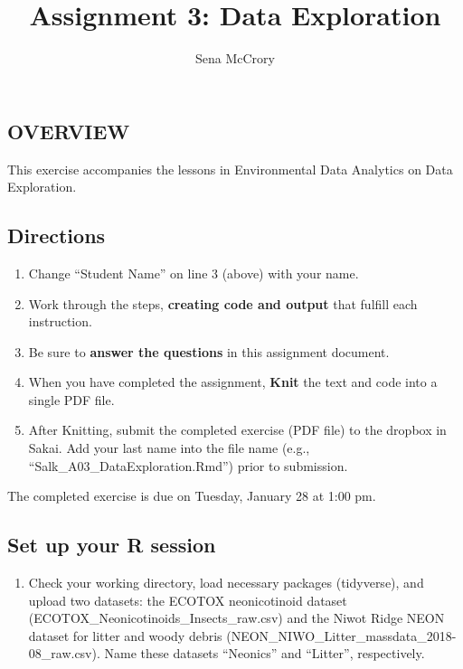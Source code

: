 \documentclass[
]{article}
\title{Assignment 3: Data Exploration}
\author{Sena McCrory}
\date{}
\providecommand{\tightlist}{%
  \setlength{\itemsep}{0pt}\setlength{\parskip}{0pt}}
\begin{document}
\maketitle

\hypertarget{overview}{%
\subsection{OVERVIEW}\label{overview}}

This exercise accompanies the lessons in Environmental Data Analytics on
Data Exploration.

\hypertarget{directions}{%
\subsection{Directions}\label{directions}}

\begin{enumerate}
\def\labelenumi{\arabic{enumi}.}
\tightlist
\item
  Change ``Student Name'' on line 3 (above) with your name.
\item
  Work through the steps, \textbf{creating code and output} that fulfill
  each instruction.
\item
  Be sure to \textbf{answer the questions} in this assignment document.
\item
  When you have completed the assignment, \textbf{Knit} the text and
  code into a single PDF file.
\item
  After Knitting, submit the completed exercise (PDF file) to the
  dropbox in Sakai. Add your last name into the file name (e.g.,
  ``Salk\_A03\_DataExploration.Rmd'') prior to submission.
\end{enumerate}

The completed exercise is due on Tuesday, January 28 at 1:00 pm.

\hypertarget{set-up-your-r-session}{%
\subsection{Set up your R session}\label{set-up-your-r-session}}

\begin{enumerate}
\def\labelenumi{\arabic{enumi}.}
\tightlist
\item
  Check your working directory, load necessary packages (tidyverse), and
  upload two datasets: the ECOTOX neonicotinoid dataset
  (ECOTOX\_Neonicotinoids\_Insects\_raw.csv) and the Niwot Ridge NEON
  dataset for litter and woody debris
  (NEON\_NIWO\_Litter\_massdata\_2018-08\_raw.csv). Name these datasets
  ``Neonics'' and ``Litter'', respectively.
\end{enumerate}
\end{document}
